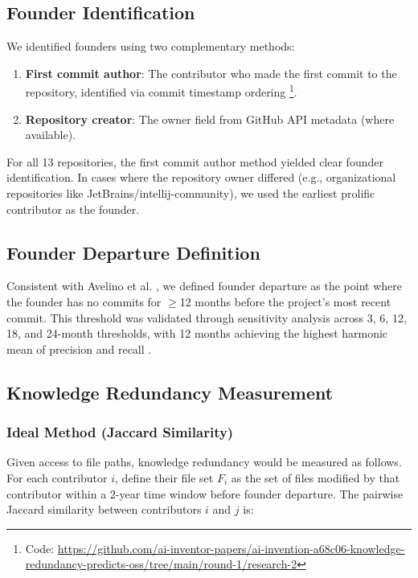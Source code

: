 \documentclass[11pt,letterpaper]{article}
\begin{document}
\subsection{Founder Identification}

We identified founders using two complementary methods:

\begin{enumerate}
    \item \textbf{First commit author}: The contributor who made the first commit to the repository, identified via commit timestamp ordering \footnote{Code: \url{https://github.com/ai-inventor-papers/ai-invention-a68c06-knowledge-redundancy-predicts-oss/tree/main/round-1/research-2}}.
    
    \item \textbf{Repository creator}: The owner field from GitHub API metadata (where available).
\end{enumerate}

For all 13 repositories, the first commit author method yielded clear founder identification. In cases where the repository owner differed (e.g., organizational repositories like JetBrains/intellij-community), we used the earliest prolific contributor as the founder.

\subsection{Founder Departure Definition}

Consistent with Avelino et al. \cite{Avelino2019}, we defined founder departure as the point where the founder has no commits for $\geq$12 months before the project's most recent commit. This threshold was validated through sensitivity analysis across 3, 6, 12, 18, and 24-month thresholds, with 12 months achieving the highest harmonic mean of precision and recall \cite{Avelino2019, art_uYucfGHDjfdU}.

\subsection{Knowledge Redundancy Measurement}

\subsubsection{Ideal Method (Jaccard Similarity)}

Given access to file paths, knowledge redundancy would be measured as follows. For each contributor $i$, define their file set $F_i$ as the set of files modified by that contributor within a 2-year time window before founder departure. The pairwise Jaccard similarity between contributors $i$ and $j$ is:
\end{document}
